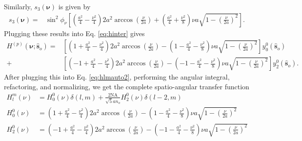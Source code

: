 \documentclass[11pt]{article}
\providecommand{\so}[1]{\mathbf{\hat{s}}_o}
\providecommand{\bs}[1]{\boldsymbol{#1}}
\begin{document}
Similarly, $s_3(\bs{\nu})$ is given by
\begin{align}
      s_3(\bs{\nu}) = &\sin^2\phi_\nu\left[\left(\frac{a^2}{4} - \frac{\nu^2}{4}\right)2a^2\arccos\left(\frac{\nu}{2a}\right) + \left(\frac{a^2}{4} + \frac{\nu^2}{8}\right)\nu a\sqrt{1 - \left(\frac{\nu}{2a}\right)^2}\right].
\end{align}
Plugging these results into Eq. \ref{eq:hinter} gives
\begin{align}
    H^{(p)}(\bs{\nu}; \so{}) = &\left[\left(1 + \frac{a^2}{4} - \frac{\nu^2}{4}\right)2a^2\arccos\left(\frac{\nu}{2a}\right) - \left(1 - \frac{a^2}{4} - \frac{\nu^2}{8}\right)\nu a\sqrt{1 - \left(\frac{\nu}{2a}\right)^2}\right]y_0^0(\so{})\nonumber\\ + &\left[\left(-1 + \frac{a^2}{4} - \frac{\nu^2}{4}\right)2a^2\arccos\left(\frac{\nu}{2a}\right) - \left(-1 - \frac{a^2}{4} - \frac{\nu^2}{8}\right)\nu a\sqrt{1 - \left(\frac{\nu}{2a}\right)^2}\right]y_2^0(\so{}).
\end{align}
After plugging this into Eq. \ref{eq:hlmauto2}, performing the angular integral,
refactoring, and normalizing, we get the complete spatio-angular transfer function
\begin{align}
  H_l^m(\nu) &= H_0^0(\nu)\delta(l, m) + \frac{2\text{NA}}{\sqrt{5}an_o}H_2^0(\nu)\delta(l-2, m)\\
  H_0^0(\nu) &= \left(1 + \frac{a^2}{4} - \frac{\nu^2}{4}\right)2a^2\arccos\left(\frac{\nu}{2a}\right) - \left(1 - \frac{a^2}{4} - \frac{\nu^2}{8}\right)\nu a\sqrt{1 - \left(\frac{\nu}{2a}\right)^2}\\
  H_2^0(\nu) &= \left(-1 + \frac{a^2}{4} - \frac{\nu^2}{4}\right)2a^2\arccos\left(\frac{\nu}{2a}\right) - \left(-1 - \frac{a^2}{4} - \frac{\nu^2}{8}\right)\nu a\sqrt{1 - \left(\frac{\nu}{2a}\right)^2}               
\end{align}
\end{document}
